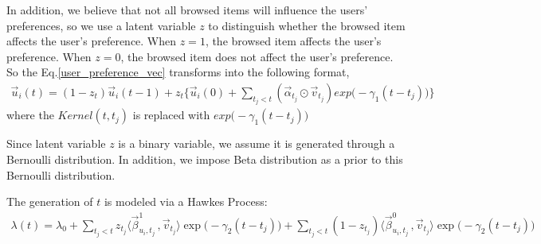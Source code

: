 \documentclass[11pt]{article}
\begin{document}
In addition, we believe that not all browsed items will influence the users' preferences, so we use a latent variable $z$ to distinguish whether the browsed item affects the user's preference. When $z=1$, the browsed item affects the user's preference. When $z=0$, the browsed item does not affect the user's preference. So the Eq.\ref{user_preference_vec} transforms into the following format,
\begin{align}
\label{user_preference_vec_z}
\vec{u}_i(t) = (1-z_t)\vec{u}_i(t-1)+z_t\big\{ \vec{u}_i(0)+\sum_{t_j<t} (\vec{\alpha}_{t_j}\odot\vec{v}_{t_j}) exp\big(-\gamma_1 (t-t_j)\big)\big\}
\end{align}
where the $Kernel(t,t_j)$ is replaced with $exp\big(-\gamma_1 (t-t_j)\big)$

Since latent variable $z$ is a binary variable, we assume it is generated through a Bernoulli distribution. In addition, we impose Beta distribution as a prior to this Bernoulli distribution.

The generation of $t$ is modeled via a Hawkes Process:
\begin{align}
\lambda(t) = \lambda_0+\sum_{t_j<t} z_{t_j}\langle\vec{\beta}_{u_i,t_j}^1\,,\vec{v}_{t_j}\rangle\exp\big(-\gamma_2 (t-t_j)\big) +\sum_{t_j<t} (1-z_{t_j})\langle\vec{\beta}_{u_i, t_j}^0\,,\vec{v}_{t_j}\rangle \exp\big(-\gamma_2 (t-t_j)\big)
\end{align}




\end{document}
